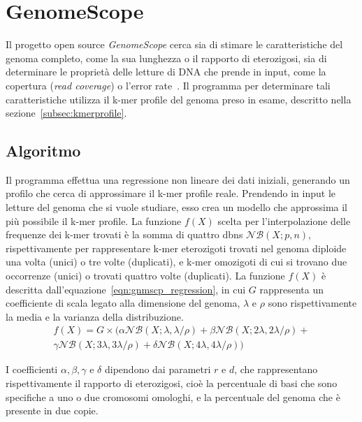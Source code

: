 \documentclass[crop=false, class=book]{standalone}
\begin{document}
	\section{GenomeScope}
	
	Il progetto open source \textit{GenomeScope} cerca sia di stimare le caratteristiche del genoma completo, come la sua lunghezza o il rapporto di eterozigosi, sia di determinare le proprietà delle letture di DNA che prende in input, come la copertura (\textit{read coverage}) o l'error rate~\cite{vurture2017genomescope}. Il programma per determinare tali caratteristiche utilizza il k-mer profile del genoma preso in esame, descritto nella sezione~\vref{subsec:kmerprofile}.
		

	\subsection{Algoritmo}
	Il programma effettua una regressione non lineare dei dati iniziali, generando un profilo che cerca di approssimare il k-mer profile reale. Prendendo in input le letture del genoma che si vuole studiare, esso crea un modello che approssima il più possibile il k-mer profile. La funzione $f(X)$ scelta per l'interpolazione delle frequenze dei k-mer trovati è la somma di quattro \glspl{dbn} $\mathcal{NB}(X;p,n)$, rispettivamente per rappresentare k-mer eterozigoti trovati nel genoma diploide una volta (unici) o tre volte (duplicati), e k-mer omozigoti di cui si trovano due occorrenze (unici) o trovati quattro volte (duplicati). La funzione $f(X)$ è descritta dall'equazione~\vref{eqn:gnmscp_regression}, in cui $G$ rappresenta un coefficiente di scala legato alla dimensione del genoma, $\lambda$ e $\rho$ sono rispettivamente la media e la varianza della distribuzione. 
	\begin{multline}
		f(X) = G \times (\alpha \mathcal{NB}(X;\lambda, \lambda/\rho) + \beta \mathcal{NB}(X;2\lambda, 2\lambda/\rho) + \\
		\gamma \mathcal{NB}(X;3\lambda, 3\lambda/\rho) + \delta \mathcal{NB}(X;4\lambda, 4\lambda/\rho)  )	
		\label{eqn:gnmscp_regression}
	\end{multline}

	I coefficienti $\alpha, \beta, \gamma$ e $\delta$ dipendono dai parametri $r$ e $d$, che rappresentano rispettivamente il rapporto di eterozigosi, cioè la percentuale di basi che sono specifiche a uno o due cromosomi omologhi, e la percentuale del genoma che è presente in due copie.
	
\end{document}
